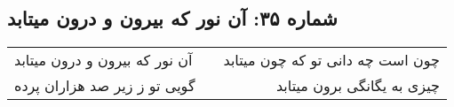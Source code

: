 \begin{center}
\section*{شماره ۳۵: آن نور که بیرون و درون میتابد}
\label{sec:035}
\begin{longtable}{l p{0.5cm} r}
آن نور که بیرون و درون میتابد
&&
چون است چه دانی تو که چون میتابد
\\
گویی تو ز زیر صد هزاران پرده
&&
چیزی به یگانگی برون میتابد
\\
\end{longtable}
\end{center}
